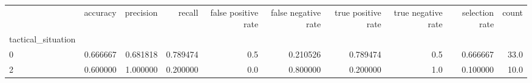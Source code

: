 \begin{tabular}{lrrrrrrrrr}
\toprule
{} &  accuracy &  precision &    recall &  false positive rate &  false negative rate &  true positive rate &  true negative rate &  selection rate &  count \\
tactical\_situation &           &            &           &                      &                      &                     &                     &                 &        \\
\midrule
0                  &  0.666667 &   0.681818 &  0.789474 &                  0.5 &             0.210526 &            0.789474 &                 0.5 &        0.666667 &   33.0 \\
2                  &  0.600000 &   1.000000 &  0.200000 &                  0.0 &             0.800000 &            0.200000 &                 1.0 &        0.100000 &   10.0 \\
\bottomrule
\end{tabular}
